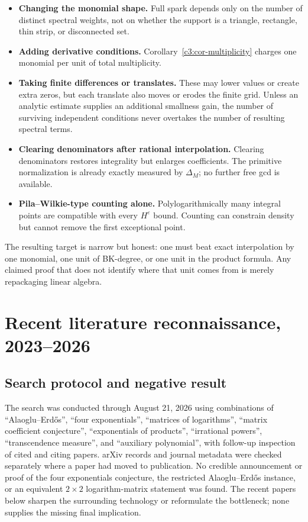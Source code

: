 \documentclass[11pt,oneside]{article}
\theoremstyle{definition}
\theoremstyle{remark}
\begin{document}
\begin{itemize}
\item \textbf{Changing the monomial shape.}  Full spark depends only on the number of distinct
      spectral weights, not on whether the support is a triangle, rectangle, thin strip, or
      disconnected set.
\item \textbf{Adding derivative conditions.}  Corollary~\ref{c3:cor-multiplicity} charges one
      monomial per unit of total multiplicity.
\item \textbf{Taking finite differences or translates.}  These may lower values or create
      extra zeros, but each translate also moves or erodes the finite grid.  Unless an analytic
      estimate supplies an additional smallness gain, the number of surviving independent
      conditions never overtakes the number of resulting spectral terms.
\item \textbf{Clearing denominators after rational interpolation.}  Clearing denominators
      restores integrality but enlarges coefficients.  The primitive normalization is already
      exactly measured by $\Delta_M$; no further free gcd is available.
\item \textbf{Pila--Wilkie-type counting alone.}  Polylogarithmically many integral points are
      compatible with every $H^\varepsilon$ bound.  Counting can constrain density but cannot
      remove the first exceptional point.
\end{itemize}

The resulting target is narrow but honest: one must beat exact interpolation by one monomial,
one unit of BK-degree, or one unit in the product formula.  Any claimed proof that does not
identify where that unit comes from is merely repackaging linear algebra.

\section{Recent literature reconnaissance, 2023--2026}
\label{sec:recentlit}

\subsection{Search protocol and negative result}

The search was conducted through August 21, 2026 using combinations of
``Alaoglu--Erd\H{o}s'', ``four exponentials'', ``matrices of logarithms'', ``matrix
coefficient conjecture'', ``exponentials of products'', ``irrational powers'',
``transcendence measure'', and ``auxiliary polynomial'', with follow-up inspection of cited
and citing papers.  arXiv records and journal metadata were checked separately where a paper
had moved to publication.  No credible announcement or proof of the four exponentials
conjecture, the restricted Alaoglu--Erd\H{o}s instance, or an equivalent $2\times2$
logarithm-matrix statement was found.  The recent papers below sharpen the surrounding
technology or reformulate the bottleneck; none supplies the missing final implication.
\end{document}
